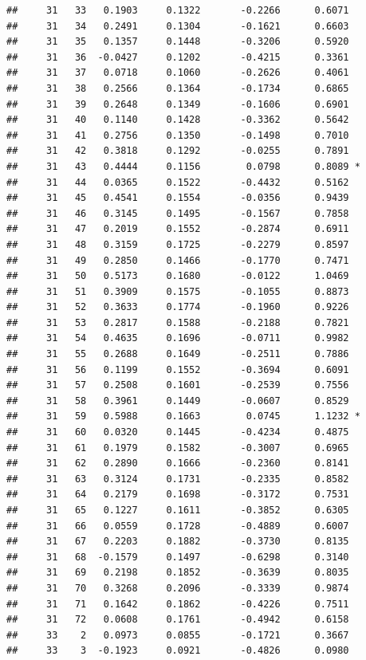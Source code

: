 \documentclass[
]{article}
\begin{document}
\begin{verbatim}
##     31   33   0.1903     0.1322       -0.2266      0.6071  
##     31   34   0.2491     0.1304       -0.1621      0.6603  
##     31   35   0.1357     0.1448       -0.3206      0.5920  
##     31   36  -0.0427     0.1202       -0.4215      0.3361  
##     31   37   0.0718     0.1060       -0.2626      0.4061  
##     31   38   0.2566     0.1364       -0.1734      0.6865  
##     31   39   0.2648     0.1349       -0.1606      0.6901  
##     31   40   0.1140     0.1428       -0.3362      0.5642  
##     31   41   0.2756     0.1350       -0.1498      0.7010  
##     31   42   0.3818     0.1292       -0.0255      0.7891  
##     31   43   0.4444     0.1156        0.0798      0.8089 *
##     31   44   0.0365     0.1522       -0.4432      0.5162  
##     31   45   0.4541     0.1554       -0.0356      0.9439  
##     31   46   0.3145     0.1495       -0.1567      0.7858  
##     31   47   0.2019     0.1552       -0.2874      0.6911  
##     31   48   0.3159     0.1725       -0.2279      0.8597  
##     31   49   0.2850     0.1466       -0.1770      0.7471  
##     31   50   0.5173     0.1680       -0.0122      1.0469  
##     31   51   0.3909     0.1575       -0.1055      0.8873  
##     31   52   0.3633     0.1774       -0.1960      0.9226  
##     31   53   0.2817     0.1588       -0.2188      0.7821  
##     31   54   0.4635     0.1696       -0.0711      0.9982  
##     31   55   0.2688     0.1649       -0.2511      0.7886  
##     31   56   0.1199     0.1552       -0.3694      0.6091  
##     31   57   0.2508     0.1601       -0.2539      0.7556  
##     31   58   0.3961     0.1449       -0.0607      0.8529  
##     31   59   0.5988     0.1663        0.0745      1.1232 *
##     31   60   0.0320     0.1445       -0.4234      0.4875  
##     31   61   0.1979     0.1582       -0.3007      0.6965  
##     31   62   0.2890     0.1666       -0.2360      0.8141  
##     31   63   0.3124     0.1731       -0.2335      0.8582  
##     31   64   0.2179     0.1698       -0.3172      0.7531  
##     31   65   0.1227     0.1611       -0.3852      0.6305  
##     31   66   0.0559     0.1728       -0.4889      0.6007  
##     31   67   0.2203     0.1882       -0.3730      0.8135  
##     31   68  -0.1579     0.1497       -0.6298      0.3140  
##     31   69   0.2198     0.1852       -0.3639      0.8035  
##     31   70   0.3268     0.2096       -0.3339      0.9874  
##     31   71   0.1642     0.1862       -0.4226      0.7511  
##     31   72   0.0608     0.1761       -0.4942      0.6158  
##     33    2   0.0973     0.0855       -0.1721      0.3667  
##     33    3  -0.1923     0.0921       -0.4826      0.0980  

\end{verbatim}
\end{document}
